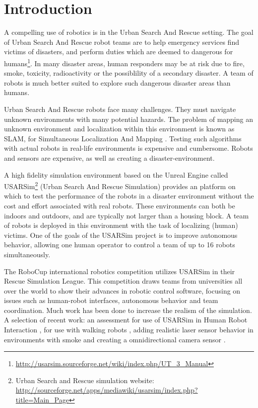 \chapter{Introduction}
\label{chapter:introduction}
A compelling use of robotics is in the Urban Search And Rescue setting. The goal of Urban Search And Rescue robot teams are to help emergency services find victims of disasters, and perform duties which are deemed to dangerous for humans\footnote{\url{http://usarsim.sourceforge.net/wiki/index.php/UT_3_Manual}}. In many disaster areas, human responders may be at risk due to fire, smoke, toxicity, radioactivity or the possiblility of a secondary disaster. A team of robots is much better suited to explore such dangerous disaster areas than humans. 

Urban Search And Rescue robots face many challenges. They must navigate unknown environments with many potential hazards. The problem of mapping an unknown environment and localization within this environment is known as SLAM, for Simultaneous Localization And Mapping \cite{durrant2006simultaneous, bailey2006simultaneous}. Testing such algorithms with actual robots in real-life environments is expensive and cumbersome. Robots and sensors are expensive, as well as creating a disaster-environment. 

A high fidelity simulation environment based on the Unreal Engine called USARSim\footnote{Urban Search and Rescue simulation website: \url{http://sourceforge.net/apps/mediawiki/usarsim/index.php?title=Main_Page}} \cite{balaguer2008usarsim} (Urban Search And Rescue Simulation) provides an platform on which to test the performance of the robots in a disaster environment without the cost and effort associated with real robots. These environments can both be indoors and outdoors, and are typically not larger than a housing block. A team of robots is deployed in this environment with the task of localizing (human) victims. One of the goals of the USARSim project is to improve autonomous behavior, allowing one human operator to control a team of up to 16 robots simultaneously. 

The RoboCup international robotics competition utilizes USARSim in their Rescue Simulation League. This competition draws teams from universities all over the world to show their advances in robotic control software, focusing on issues such as human-robot interfaces, autonomous behavior and team coordination. Much work has been done to increase the realism of the simulation. A selection of recent work: an assessment for use of USARSim in Human Robot Interaction \cite{wang2005validating}, for use with walking robots \cite{van2012validation}, adding realistic laser sensor behavior in environments with smoke \cite{formsma2011realistic} and creating a omnidirectional camera sensor \cite{schmits2009omnidirectional}.

